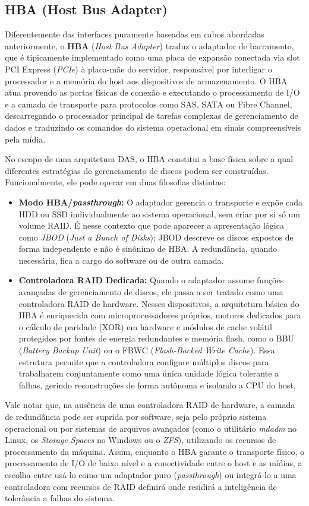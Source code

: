 \documentclass[11pt,a4paper]{article}
\begin{document}
\subsection{HBA (Host Bus Adapter)}
Diferentemente das interfaces puramente baseadas em cabos abordadas anteriormente, o \textbf{HBA} (\emph{Host Bus Adapter}) traduz o adaptador de barramento, que é tipicamente implementado como uma placa de expansão conectada via slot PCI Express (\emph{PCIe}) à placa-mãe do servidor, responsável por interligar o processador e a memória do host aos dispositivos de armazenamento. O HBA atua provendo as portas físicas de conexão e executando o processamento de I/O e a camada de transporte para protocolos como SAS, SATA ou Fibre Channel, descarregando o processador principal de tarefas complexas de gerenciamento de dados e traduzindo os comandos do sistema operacional em sinais compreensíveis pela mídia.

No escopo de uma arquitetura DAS, o HBA constitui a base física sobre a qual diferentes estratégias de gerenciamento de discos podem ser construídas. Funcionalmente, ele pode operar em duas filosofias distintas:
\begin{itemize}[leftmargin=*]
    \item \textbf{Modo HBA/\emph{passthrough}:} O adaptador gerencia o transporte e expõe cada HDD ou SSD individualmente ao sistema operacional, sem criar por si só um volume RAID. É nesse contexto que pode aparecer a apresentação lógica como \emph{JBOD} (\emph{Just a Bunch of Disks}); JBOD descreve os discos expostos de forma independente e não é sinônimo de HBA. A redundância, quando necessária, fica a cargo do software ou de outra camada.
    \item \textbf{Controladora RAID Dedicada:} Quando o adaptador assume funções avançadas de gerenciamento de discos, ele passa a ser tratado como uma controladora RAID de hardware. Nesses dispositivos, a arquitetura básica do HBA é enriquecida com microprocessadores próprios, motores dedicados para o cálculo de paridade (XOR) em hardware e módulos de cache volátil protegidos por fontes de energia redundantes e memória flash, como o BBU (\emph{Battery Backup Unit}) ou o FBWC (\emph{Flash-Backed Write Cache}). Essa estrutura permite que a controladora configure múltiplos discos para trabalharem conjuntamente como uma única unidade lógica tolerante a falhas, gerindo reconstruções de forma autônoma e isolando a CPU do host.
\end{itemize}

Vale notar que, na ausência de uma controladora RAID de hardware, a camada de redundância pode ser suprida por software, seja pelo próprio sistema operacional ou por sistemas de arquivos avançados (como o utilitário \emph{mdadm} no Linux, os \emph{Storage Spaces} no Windows ou o \emph{ZFS}), utilizando os recursos de processamento da máquina. Assim, enquanto o HBA garante o transporte físico, o processamento de I/O de baixo nível e a conectividade entre o host e as mídias, a escolha entre usá-lo como um adaptador puro (\emph{passthrough}) ou integrá-lo a uma controladora com recursos de RAID definirá onde residirá a inteligência de tolerância a falhas do sistema.
\end{document}
